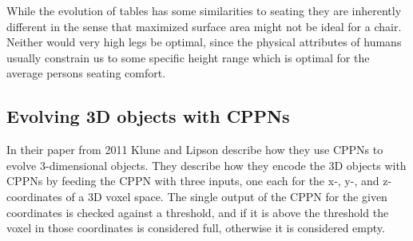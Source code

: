 While the evolution of tables has some similarities to seating they are inherently
different in the sense that maximized surface area might not be ideal for a
chair.
Neither would very high legs be optimal, since the physical attributes of humans
usually constrain us to some specific height range which is optimal for the
average persons seating comfort.

\subsection{Evolving 3D objects with CPPNs}
In their paper from 2011 Klune and Lipson describe how they use CPPNs to evolve 3-dimensional objects\cite{Clune:2011:EOG:2078245.2078246}.
They describe how they encode the 3D objects with CPPNs by feeding the CPPN with three inputs, one each for the x-, y-, and z- coordinates of a 3D voxel space.
The single output of the CPPN for the given coordinates is checked against a threshold, and if it is above the threshold the voxel in those coordinates is considered full, otherwise it is considered empty\cite[p.~5]{Clune:2011:EOG:2078245.2078246}.

